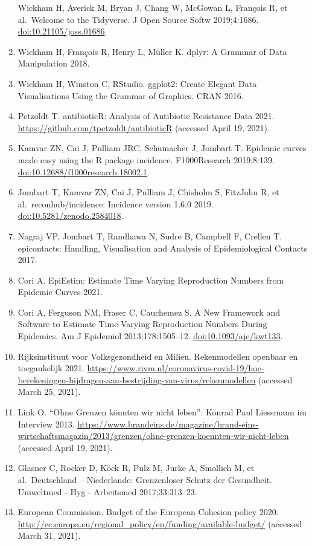 \documentclass[
]{book}
\begin{document}
\begin{enumerate}
  Wickham H, Averick M, Bryan J, Chang W, McGowan L, François R, et al.~Welcome to the Tidyverse. J Open Source Softw 2019;4:1686. \url{doi:10.21105/joss.01686}.
\item
  Wickham H, François R, Henry L, Müller K. dplyr: A Grammar of Data Manipulation 2018.
\item
  Wickham H, Winston C, RStudio. ggplot2: Create Elegant Data Visualisations Using the Grammar of Graphics. CRAN 2016.
\item
  Petzoldt T. antibioticR: Analysis of Antibiotic Resistance Data 2021. \url{https://github.com/tpetzoldt/antibioticR} (accessed April 19, 2021).
\item
  Kamvar ZN, Cai J, Pulliam JRC, Schumacher J, Jombart T. Epidemic curves made easy using the R package incidence. F1000Research 2019;8:139. \url{doi:10.12688/f1000research.18002.1}.
\item
  Jombart T, Kamvar ZN, Cai J, Pulliam J, Chisholm S, FitzJohn R, et al.~reconhub/incidence: Incidence version 1.6.0 2019. \url{doi:10.5281/zenodo.2584018}.
\item
  Nagraj VP, Jombart T, Randhawa N, Sudre B, Campbell F, Crellen T. epicontacts: Handling, Visualisation and Analysis of Epidemiological Contacts 2017.
\item
  Cori A. EpiEstim: Estimate Time Varying Reproduction Numbers from Epidemic Curves 2021.
\item
  Cori A, Ferguson NM, Fraser C, Cauchemez S. A New Framework and Software to Estimate Time-Varying Reproduction Numbers During Epidemics. Am J Epidemiol 2013;178:1505--12. \url{doi:10.1093/aje/kwt133}.
\item
  Rijksinstituut voor Volksgezondheid en Milieu. Rekenmodellen openbaar en toegankelijk 2021. \url{https://www.rivm.nl/coronavirus-covid-19/hoe-berekeningen-bijdragen-aan-bestrijding-van-virus/rekenmodellen} (accessed March 25, 2021).
\item
  Link O. ``Ohne Grenzen könnten wir nicht leben'': Konrad Paul Liessmann im Interview 2013. \url{https://www.brandeins.de/magazine/brand-eins-wirtschaftsmagazin/2013/grenzen/ohne-grenzen-koennten-wir-nicht-leben} (accessed April 19, 2021).
\item
  Glasner C, Rocker D, Köck R, Pulz M, Jurke A, Smollich M, et al.~Deutschland -- Niederlande: Grenzenloser Schutz der Gesundheit. Umweltmed - Hyg - Arbeitsmed 2017;33:313--23.
\item
  European Commission. Budget of the European Cohesion policy 2020. \url{http://ec.europa.eu/regional_policy/en/funding/available-budget/} (accessed March 31, 2021).

\end{enumerate}
\end{document}
